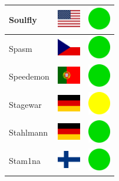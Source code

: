 \documentclass[12pt, a4paper, twoside]{report}
\begin{document}
\begin{center}
\begin{longtable}{|p{5cm}|p{2cm}|p{2cm}|}
Soulfly & \includegraphics[width=1cm]{4x3/us} & \includegraphics[width=1cm]{likes/y} \\ \hline
Spasm & \includegraphics[width=1cm]{4x3/cz} & \includegraphics[width=1cm]{likes/y} \\ \hline
Speedemon & \includegraphics[width=1cm]{4x3/pt} & \includegraphics[width=1cm]{likes/y} \\ \hline
Stagewar & \includegraphics[width=1cm]{4x3/de} & \includegraphics[width=1cm]{likes/m} \\ \hline
Stahlmann & \includegraphics[width=1cm]{4x3/de} & \includegraphics[width=1cm]{likes/y} \\ \hline
Stam1na & \includegraphics[width=1cm]{4x3/fi} & \includegraphics[width=1cm]{likes/y} \\ \hline

\end{longtable}
\end{center}
\end{document}
